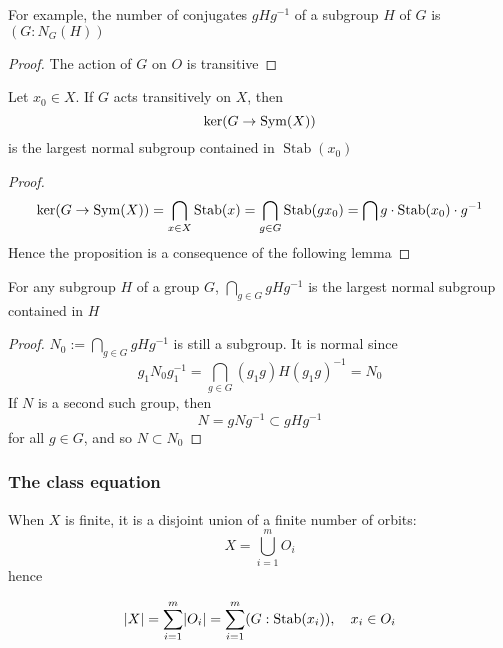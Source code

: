 \documentclass[11pt]{article}
\DeclareMathOperator{\Stab}{Stab}
\begin{document}
For example, the number of conjugates \(gHg^{-1}\) of a subgroup \(H\) of \(G\)
is \((G:N_G(H))\)

\begin{proof}
The action of \(G\) on \(O\) is transitive
\end{proof}

\begin{proposition}[]
Let \(x_0\in X\). If \(G\) acts transitively on \(X\), then
\begin{equation*}
\ker(G\to\operatorname{Sym}(X))
\end{equation*}
is the largest normal subgroup contained in \(\Stab(x_0)\)
\end{proposition}

\begin{proof}
\begin{equation*}
\ker(G\to\Sym(X))=\bigcap_{x\in X}\Stab(x)=\bigcap_{g\in G}\Stab(gx_0)=\bigcap g\cdot\Stab(x_0)\cdot g^{-1}
\end{equation*}
Hence the proposition is a consequence of the following lemma
\end{proof}

\begin{lemma}[]
For any subgroup \(H\) of a group \(G\), \(\bigcap_{g\in G}gHg^{-1}\) is the largest normal subgroup
contained in \(H\)
\end{lemma}

\begin{proof}
\(N_0:=\bigcap_{g\in G}gHg^{-1}\) is still a subgroup. It is normal since
\begin{equation*}
g_1N_0g_1^{-1}=\bigcap_{g\in G}(g_1g)H(g_1g)^{-1}=N_0
\end{equation*}
If \(N\) is a second such group, then
\begin{equation*}
N=gNg^{-1}\subset gHg^{-1}
\end{equation*}
for all \(g\in G\), and so \(N\subset N_0\)
\end{proof}

\subsubsection{The class equation}
\label{sec:orga3f8dd2}
When \(X\) is finite, it is a disjoint union of a finite number of orbits:
\begin{equation*}
X=\bigcup_{i=1}^mO_i
\end{equation*}
hence
\begin{proposition}[]
\begin{equation*}
\abs{X}=\sum_{i=1}^m\abs{O_i}=\sum_{i=1}^m(G:\Stab(x_i)),\quad x_i\in O_i
\end{equation*}
\end{proposition}
\end{document}
